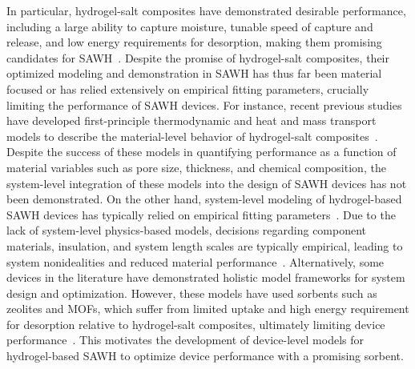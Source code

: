\documentclass[11pt]{article}
\begin{document}
In particular, hydrogel-salt composites have demonstrated desirable performance, including a large ability to capture moisture, tunable speed of capture and release, and low energy requirements for desorption, making them promising candidates for SAWH~\cite{lu2022,graeber2023,entezari2020,xu2024}. Despite the promise of hydrogel-salt composites, their optimized modeling and demonstration in SAWH has thus far been material focused or has relied extensively on empirical fitting parameters, crucially limiting the performance of SAWH devices. For instance, recent previous studies have developed first-principle thermodynamic and heat and mass transport models to describe the material-level behavior of hydrogel-salt composites~\cite{xu2021,park2022}. Despite the success of these models in quantifying performance as a function of material variables such as pore size, thickness, and chemical composition, the system-level integration of these models into the design of SAWH devices has not been demonstrated. On the other hand, system-level modeling of hydrogel-based SAWH devices has typically relied on empirical fitting parameters~\cite{park2022}. Due to the lack of system-level physics-based models, decisions regarding component materials, insulation, and system length scales are typically empirical, leading to system nonidealities and reduced material performance~\cite{meng2022,wilson2023,li2022}. Alternatively, some devices in the literature have demonstrated holistic model frameworks for system design and optimization. However, these models have used sorbents such as zeolites and MOFs, which suffer from limited uptake and high energy requirement for desorption relative to hydrogel-salt composites, ultimately limiting device performance~\cite{lapotin2021,lapotin2019,diazmarin2024,kim2018}. This motivates the development of device-level models for hydrogel-based SAWH to optimize device performance with a promising sorbent.
\end{document}
